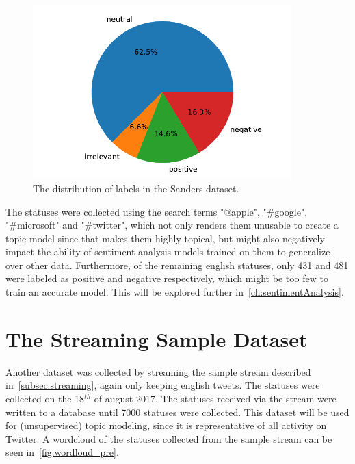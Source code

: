 \begin{figure}
    \centering
    \caption{The distribution of labels in the Sanders dataset.}
    \label{fig:sanders_sentiment}
    \includegraphics[width=10cm]{../figures/sanders_sentiment.pdf}
\end{figure}

The statuses were collected using the search terms "@apple", "\#google", "\#microsoft" and "\#twitter",
which not only renders them unusable to create a topic model since that makes them highly topical,
but might also negatively impact the ability of sentiment analysis models trained on them to generalize over other data.
Furthermore, of the remaining english statuses, only 431 and 481 were labeled as positive and negative respectively,
which might be too few to train an accurate model.
This will be explored further in~\autoref{ch:sentimentAnalysis}.

\section{The Streaming Sample Dataset}
\label{sec:streamingSampleDataset}

Another dataset was collected by streaming the sample stream described in~\autoref{subsec:streaming},
again only keeping english tweets.
The statuses were collected on the 18$^{th}$ of august 2017.
The statuses received via the stream were written to a database until 7000 statuses were collected.
This dataset will be used for (unsupervised) topic modeling, since it is representative of all activity on Twitter.
A wordcloud of the statuses collected from the sample stream can be seen in~\autoref{fig:wordloud_pre}.


